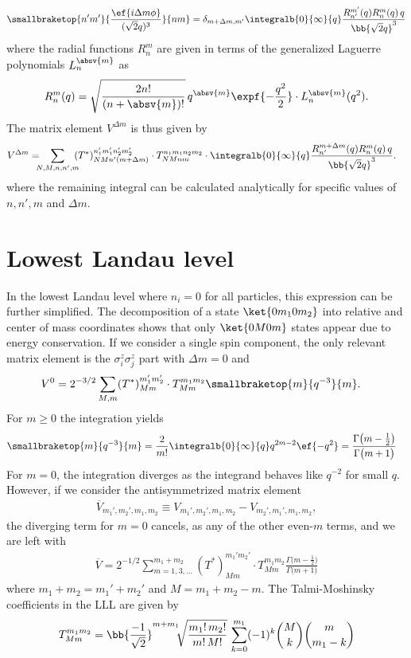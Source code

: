 \begin{align}
\smallbraketop{n'm'}{\frac{\ef{i\Delta m \phi}}{(\sqrt{2} q)^3}}{nm} = \delta_{m+\Delta m,m'} \integralb{0}{\infty}{q} \frac{R_{n'}^{m'}(q) R_n^m(q) \,q}{\bb{\sqrt{2} q}^3}
\end{align}
where the radial functions $R_n^m$ are given in terms of the generalized Laguerre polynomials $L_n^{\absv{m}}$ as
\begin{align}
R_n^m(q) = \sqrt{\frac{2n!}{(n+\absv{m})!}}\, q^{\absv{m}}\expf{-\frac{q^2}{2}}\cdot L_n^{\absv{m}}(q^2).
\end{align}
The matrix element $V^{\Delta m}$ is thus given by
\begin{align}
V^{\Delta m}= \!\!\! &\sum_{N,M,n,n',m} \!\!\! (T^*)^{n_1'm_1'n_2'm_2'}_{NMn'(m+\Delta m)} \cdot T^{n_1m_1n_2m_2}_{NMnm} \cdot
 \integralb{0}{\infty}{q} \frac{R_{n'}^{m+\Delta m}(q) R_n^m(q) \,q}{\bb{\sqrt{2} q}^3}.
\end{align}
where the remaining integral can be calculated analytically for specific values of $n,n',m$ and $\Delta m$.

\section{Lowest Landau level}
In the lowest Landau level where $n_i=0$ for all particles, this expression can be further simplified. The decomposition of a state $\ket{0m_10m_2}$ into relative and center of mass coordinates shows that only $\ket{0M0m}$ states appear due to energy conservation. If we consider a single spin component, the only relevant matrix element is the $\sigma^z_i \sigma^z_j$ part with $\Delta m=0$ and
\begin{align}
V^0 &= 2^{-3/2} \sum_{M,m}  (T^*)^{m_1'm_2'}_{Mm} \cdot T^{m_1m_2}_{Mm} \smallbraketop{m}{q^{-3}}{m}.
\end{align}
For $m\ge 0$ the integration yields
\begin{align}
\smallbraketop{m}{q^{-3}}{m} &= \frac{2}{m!} \integralb{0}{\infty}{q} q^{2m-2} \ef{-q^2}
= \frac{\Gamma\big(m-\frac{1}{2}\big)}{\Gamma\big(m+1\big)}
\end{align}
For $m=0$, the integration diverges as the integrand behaves like $q^{-2}$ for small $q$. However, if we consider the antisymmetrized matrix element
\begin{align}
\overline{V}_{m_1',m_2',m_1,m_2} \equiv V_{m_1',m_2',m_1,m_2} - V_{m_2',m_1',m_1,m_2},
\end{align}
the diverging term for $m=0$ cancels, as any of the other even-$m$ terms, and we are left with
\begin{align}
\overline{V} = 2^{-1/2} \!\! \sum_{m = 1,3,\dots}^{m_1+m_2} \!\! (T^*)^{m_1'm_2'}_{Mm} \cdot T^{m_1m_2}_{Mm} \frac{\Gamma\big(m-\frac{1}{2}\big)}{\Gamma\big(m+1\big)}
\end{align}
where $m_1+m_2 = m_1'+m_2'$ and  $M=m_1+m_2-m$. The Talmi-Moshinsky coefficients in the LLL are given by
\begin{align}
T^{m_1m_2}_{Mm} = \bb{\frac{-1}{\sqrt{2}}}^{m+m_1} \!\! \sqrt{\frac{m_1!\,m_2!}{m!\, M!}} \,\sum_{k=0}^{m_1} (-1)^k \binom{M}{k} \binom{m}{m_1-k}
\end{align}
